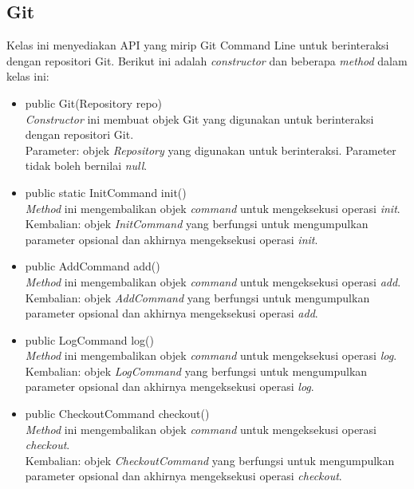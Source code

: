\subsection{Git}
\label{subsec:Git}
Kelas ini menyediakan API yang mirip Git Command Line untuk berinteraksi dengan repositori Git. Berikut ini adalah \textit{constructor} dan beberapa \textit{method} dalam kelas ini:
\begin{itemize}
\item public Git(Repository repo)\\
\textit{Constructor} ini membuat objek Git yang digunakan untuk berinteraksi dengan repositori Git.\\
Parameter: objek \textit{Repository} yang digunakan untuk berinteraksi. Parameter tidak boleh bernilai \textit{null}. 

\item public static InitCommand init()\\
\textit{Method} ini mengembalikan objek \textit{command} untuk mengeksekusi operasi \textit{init}.\\
Kembalian: objek \textit{InitCommand} yang berfungsi untuk mengumpulkan parameter opsional dan akhirnya mengeksekusi operasi \textit{init}.

\item public AddCommand add()\\
\textit{Method} ini mengembalikan objek \textit{command} untuk mengeksekusi operasi \textit{add}.\\
Kembalian: objek \textit{AddCommand} yang berfungsi untuk mengumpulkan parameter opsional dan akhirnya mengeksekusi operasi \textit{add}.

\item public LogCommand log()\\
\textit{Method} ini mengembalikan objek \textit{command} untuk mengeksekusi operasi \textit{log}.\\
Kembalian: objek \textit{LogCommand} yang berfungsi untuk mengumpulkan parameter opsional dan akhirnya mengeksekusi operasi \textit{log}.

\item public CheckoutCommand checkout()\\
\textit{Method} ini mengembalikan objek \textit{command} untuk mengeksekusi operasi \textit{checkout}.\\
Kembalian: objek \textit{CheckoutCommand} yang berfungsi untuk mengumpulkan parameter opsional dan akhirnya mengeksekusi operasi \textit{checkout}.


\end{itemize}

